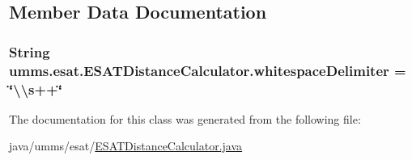 \subsection{Member Data Documentation}
\hypertarget{classumms_1_1esat_1_1_e_s_a_t_distance_calculator_a7b19a77271ed47cdd4b4723d58be55b8}{
\subsubsection[{whitespace\+Delimiter}]{\setlength{\rightskip}{0pt plus 5cm}String umms.\+esat.\+E\+S\+A\+T\+Distance\+Calculator.\+whitespace\+Delimiter = \char`\"{}\textbackslash{}\textbackslash{}s++\char`\"{}\hspace{0.3cm}{\ttfamily [static]}}}\label{classumms_1_1esat_1_1_e_s_a_t_distance_calculator_a7b19a77271ed47cdd4b4723d58be55b8}


The documentation for this class was generated from the following file\+:\begin{DoxyCompactItemize}
\item 
java/umms/esat/\hyperlink{_e_s_a_t_distance_calculator_8java}{E\+S\+A\+T\+Distance\+Calculator.\+java}\end{DoxyCompactItemize}
